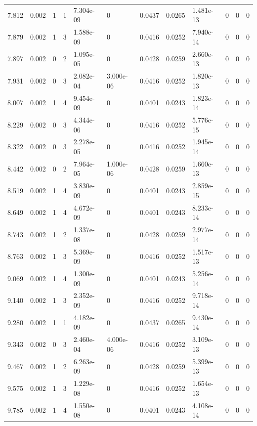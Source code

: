 \documentclass[preview]{standalone}
\begin{document}
{{{\begin{tabular}{L{1.2cm}C{1.2cm} C{0.3cm}C{0.5cm} C{1.4cm}C{1.4cm} C{1.4cm}C{1.4cm} C{1.6cm}C{1.6cm} C{1.6cm}C{1.6cm}}
  7.812  &  0.002  & 1     &  1 &  7.304e-09  & 0  &  0.0437&   0.0265& 1.481e-13 & 0   &  0 & 0  \\ 
  7.879  &  0.002  & 1     &  3 &  1.588e-09  & 0  &  0.0416&   0.0252& 7.940e-14 & 0   &  0 & 0  \\ 
  7.897  &  0.002  & 0     &  2 &  1.095e-05  & 0  &  0.0428&   0.0259& 2.660e-13 & 0   &  0 & 0  \\ 
  7.931  &  0.002  & 0     &  3 &  2.082e-04  & 3.000e-06  &  0.0416&   0.0252& 1.820e-13 & 0   &  0 & 0  \\ 
  8.007  &  0.002  & 1     &  4 &  9.454e-09  & 0  &  0.0401&   0.0243& 1.823e-14 & 0   &  0 & 0  \\ 
  8.229  &  0.002  & 0     &  3 &  4.344e-06  & 0  &  0.0416&   0.0252& 5.776e-15 & 0   &  0 & 0  \\ 
  8.322  &  0.002  & 0     &  3 &  2.278e-05  & 0  &  0.0416&   0.0252& 1.945e-14 & 0   &  0 & 0  \\ 
  8.442  &  0.002  & 0     &  2 &  7.964e-05  & 1.000e-06  &  0.0428&   0.0259& 1.660e-13 & 0   &  0 & 0  \\ 
  8.519  &  0.002  & 1     &  4 &  3.830e-09  & 0  &  0.0401&   0.0243& 2.859e-15 & 0   &  0 & 0  \\ 
  8.649  &  0.002  & 1     &  4 &  4.672e-09  & 0  &  0.0401&   0.0243& 8.233e-14 & 0   &  0 & 0  \\ 
  8.743  &  0.002  & 1     &  2 &  1.337e-08  & 0  &  0.0428&   0.0259& 2.977e-14 & 0   &  0 & 0  \\ 
  8.763  &  0.002  & 1     &  3 &  5.369e-09  & 0  &  0.0416&   0.0252& 1.517e-13 & 0   &  0 & 0  \\ 
  9.069  &  0.002  & 1     &  4 &  1.300e-09  & 0  &  0.0401&   0.0243& 5.256e-14 & 0   &  0 & 0  \\ 
  9.140  &  0.002  & 1     &  3 &  2.352e-09  & 0  &  0.0416&   0.0252& 9.718e-14 & 0   &  0 & 0  \\ 
  9.280  &  0.002  & 1     &  1 &  4.182e-09  & 0  &  0.0437&   0.0265& 9.430e-14 & 0   &  0 & 0  \\ 
  9.343  &  0.002  & 0     &  3 &  2.460e-04  & 4.000e-06  &  0.0416&   0.0252& 3.109e-13 & 0   &  0 & 0  \\ 
  9.467  &  0.002  & 1     &  2 &  6.263e-09  & 0  &  0.0428&   0.0259& 5.399e-13 & 0   &  0 & 0  \\ 
  9.575  &  0.002  & 1     &  3 &  1.229e-08  & 0  &  0.0416&   0.0252& 1.654e-13 & 0   &  0 & 0  \\ 
  9.785  &  0.002  & 1     &  4 &  1.550e-08  & 0  &  0.0401&   0.0243& 4.108e-14 & 0   &  0 & 0  \\ 

\end{tabular}}}}
\end{document}

